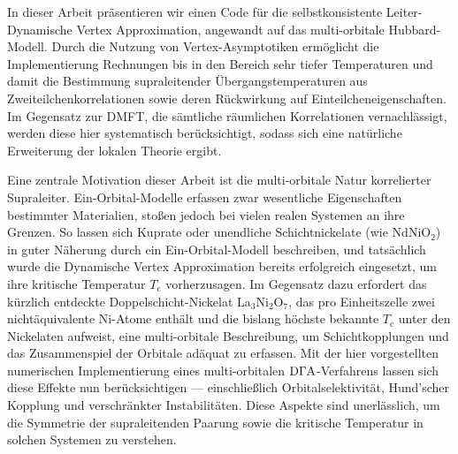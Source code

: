 \documentclass[../../main.tex]{subfiles}
\begin{document}
In dieser Arbeit präsentieren wir einen Code für die selbstkonsistente Leiter-Dynamische Vertex Approximation, angewandt auf das multi-orbitale Hubbard-Modell. Durch die Nutzung von Vertex-Asymptotiken ermöglicht die Implementierung Rechnungen bis in den Bereich sehr tiefer Temperaturen und damit die Bestimmung supraleitender Übergangstemperaturen aus Zweiteilchenkorrelationen sowie deren Rückwirkung auf Einteilcheneigenschaften. Im Gegensatz zur DMFT, die sämtliche räumlichen Korrelationen vernachlässigt, werden diese hier systematisch berücksichtigt, sodass sich eine natürliche Erweiterung der lokalen Theorie ergibt.
\newline

Eine zentrale Motivation dieser Arbeit ist die multi-orbitale Natur korrelierter Supraleiter. Ein-Orbital-Modelle erfassen zwar wesentliche Eigenschaften bestimmter Materialien, stoßen jedoch bei vielen realen Systemen an ihre Grenzen. So lassen sich Kuprate oder unendliche Schichtnickelate (wie NdNiO$_2$) in guter Näherung durch ein Ein-Orbital-Modell beschreiben, und tatsächlich wurde die Dynamische Vertex Approximation bereits erfolgreich eingesetzt, um ihre kritische Temperatur $T_{\mathrm{c}}$ vorherzusagen. Im Gegensatz dazu erfordert das kürzlich entdeckte Doppelschicht-Nickelat La$_3$Ni$_2$O$_7$, das pro Einheitszelle zwei nichtäquivalente Ni-Atome enthält und die bislang höchste bekannte $T_{\mathrm{c}}$ unter den Nickelaten aufweist, eine multi-orbitale Beschreibung, um Schichtkopplungen und das Zusammenspiel der Orbitale adäquat zu erfassen. Mit der hier vorgestellten numerischen Implementierung eines multi-orbitalen $\text{D}\Gamma\text{A}$-Verfahrens lassen sich diese Effekte nun berücksichtigen --- einschließlich Orbitalselektivität, Hund'scher Kopplung und verschränkter Instabilitäten. Diese Aspekte sind unerlässlich, um die Symmetrie der supraleitenden Paarung sowie die kritische Temperatur in solchen Systemen zu verstehen.
\end{document}
